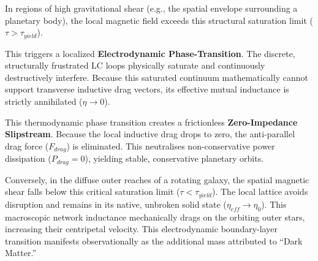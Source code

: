 In regions of high gravitational shear (e.g., the spatial envelope surrounding a planetary body), the local magnetic field exceeds this structural saturation limit ($\tau > \tau_{yield}$).

This triggers a localized \textbf{Electrodynamic Phase-Transition}. The discrete, structurally frustrated LC loops physically saturate and continuously destructively interfere. Because this saturated continuum mathematically cannot support transverse inductive drag vectors, its effective mutual inductance is strictly annihilated ($\eta \to 0$). 

This thermodynamic phase transition creates a frictionless \textbf{Zero-Impedance Slipstream}. Because the local inductive drag drops to zero, the anti-parallel drag force ($F_{drag}$) is eliminated. This neutralises non-conservative power dissipation ($P_{drag} = 0$), yielding stable, conservative planetary orbits.

Conversely, in the diffuse outer reaches of a rotating galaxy, the spatial magnetic shear falls below this critical saturation limit ($\tau < \tau_{yield}$). The local lattice avoids disruption and remains in its native, unbroken solid state ($\eta_{eff} \to \eta_0$). This macroscopic network inductance mechanically drags on the orbiting outer stars, increasing their centripetal velocity. This electrodynamic boundary-layer transition manifests observationally as the additional mass attributed to ``Dark Matter.''

